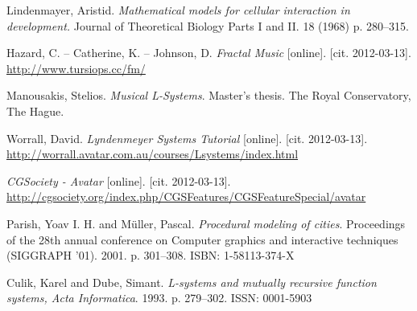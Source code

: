 
\def\bibname{References}
\begin{thebibliography}{99}
\addcontentsline{toc}{chapter}{\bibname}

	{\sc Lindenmayer,} Aristid.
	\emph{Mathematical models for cellular interaction in development.}
	Journal of Theoretical Biology Parts I and II.
	18 (1968)
	p. 280--315.
	
	{\sc Hazard,} C. -- {\sc Catherine,} K. -- {\sc Johnson,} D.
	\emph{Fractal Music} [online]. [cit. 2012-03-13].
	\url{http://www.tursiops.cc/fm/}
	
	{\sc Manousakis,} Stelios.
	\emph{Musical L-Systems}.
	Master’s thesis.
	The Royal Conservatory, The Hague.
	
	{\sc Worrall,} David.
	\emph{Lyndenmeyer Systems Tutorial} [online]. [cit. 2012-03-13].
	\url{http://worrall.avatar.com.au/courses/Lsystems/index.html}
	
	\emph{CGSociety - Avatar} [online]. [cit. 2012-03-13].
	\url{http://cgsociety.org/index.php/CGSFeatures/CGSFeatureSpecial/avatar}
		
	{\sc Parish,} Yoav I. H. and {\sc M\"{u}ller,} Pascal.
	\emph{Procedural modeling of cities}.
	Proceedings of the 28th annual conference on Computer graphics and interactive techniques (SIGGRAPH '01).
	2001.
	p. 301--308.
	ISBN: 1-58113-374-X
	
	{\sc Culik,} Karel and {\sc Dube,} Simant.
	\emph{L-systems and mutually recursive function systems, Acta Informatica}.
	1993.
	p. 279--302.
	ISSN: 0001-5903
	



\end{thebibliography}
